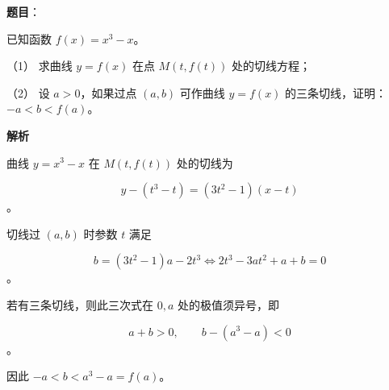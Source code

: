 \begin{answer}

\textbf{题目}：

已知函数 $f(x)=x^3-x$。

（1） 求曲线 $y=f(x)$ 在点 $M(t,f(t))$ 处的切线方程；

（2） 设 $a>0$，如果过点 $(a,b)$ 可作曲线 $y=f(x)$ 的三条切线，证明：$-a<b<f(a)$。

\textbf{解析}


曲线 $y=x^3-x$ 在 $M(t,f(t))$ 处的切线为

\nopagebreak[4]
\[
y-(t^3-t)=(3t^2-1)(x-t)
\]
。


切线过 $(a,b)$ 时参数 $t$ 满足

\nopagebreak[4]
\[
b=(3t^2-1)a-2t^3
\Longleftrightarrow 2t^3-3at^2+a+b=0
\]
。

若有三条切线，则此三次式在 $0,a$ 处的极值须异号，即

\nopagebreak[4]
\[
a+b>0,\qquad b-(a^3-a)<0
\]
。

因此 $-a<b<a^3-a=f(a)$。



\end{answer}